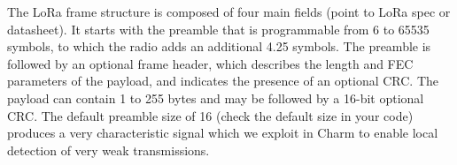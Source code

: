 
The LoRa frame structure is composed of four main
fields {\color{blue} (point to LoRa spec or datasheet)}. It starts with the preamble that is programmable from 6 to 65535 symbols, to which the radio adds an additional 4.25 symbols. The preamble is followed by an optional frame header, which describes the length and FEC parameters of the payload, and indicates the presence of an optional CRC. The payload can contain 1 to 255 bytes and may be followed by a 16-bit optional CRC. The default preamble size of 16 {\color{blue} (check the default size in your code)} produces a very characteristic signal which we exploit in Charm to enable local detection of very weak transmissions.



